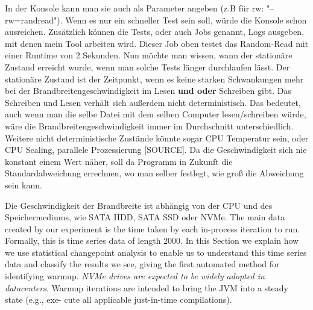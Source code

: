 \documentclass{article}
\begin{document}
In der Konsole kann man sie auch als Parameter angeben (z.B für rw: "--rw=randread"). Wenn es nur ein schneller Test sein soll, würde die Konsole schon ausreichen.
Zusätzlich können die Tests, 
oder auch Jobs genannt, Logs ausgeben, mit denen mein Tool arbeiten wird. Dieser Job oben testet das Random-Read mit einer
Runtime von 2 Sekunden. Nun möchte man wissen, wann der stationäre Zustand erreicht wurde, wenn man solche Tests länger durchlaufen lässt.
Der stationäre Zustand ist der Zeitpunkt, wenn es keine starken Schwankungen mehr bei der Brandbreitengeschwindigkeit im Lesen \textbf{und oder} Schreiben gibt.
Das Schreiben und Lesen verhält sich außerdem nicht deterministisch. Das bedeutet, auch wenn man die selbe Datei mit dem selben Computer lesen/schreiben
würde, wäre die Brandbreitengeschwindigkeit immer im Durchschnitt unterschiedlich. Weitere nicht deterministische Zustände könnte sogar CPU Temperatur sein,
oder CPU Scaling, parallele Prozessierung [SOURCE]. Da die Geschwindigkeit sich nie konstant einem Wert näher, soll da Programm in Zukunft die Standardabweichung errechnen,
wo man selber festlegt, wie groß die Abweichung sein kann. 

Die Geschwindigkeit der Brandbreite ist abhängig von der CPU und des Speichermediums, wie SATA HDD, SATA SSD oder NVMe.
The main data created by our experiment is the time taken by each in-process iteration to run.
Formally, this is time series data of length 2000. In this Section we explain how we use statistical
changepoint analysis to enable us to understand this time series data and classify the results we
see, giving the first automated method for identifying warmup.
\textit{NVMe drives are expected to be widely adopted in datacenters}.
Warmup iterations
are intended to bring the JVM into a steady state (e.g., exe-
cute all applicable just-in-time compilations).
\end{document}
